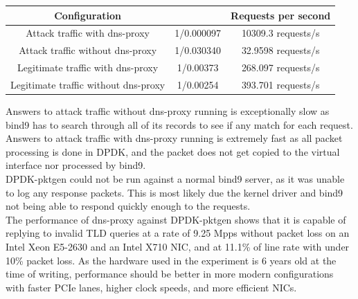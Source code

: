\documentclass[12pt]{extarticle}
\begin{document}
\begin{center}
\begin{tabular}{ ||c|c|c|| }
\hline
Configuration &  & Requests per second \\
\hline
Attack traffic with dns-proxy & 1/0.000097 & 10309.3 requests/s \\
Attack traffic without dns-proxy & 1/0.030340 & 32.9598 requests/s \\
Legitimate traffic with dns-proxy & 1/0.00373 & 268.097 requests/s \\
Legitimate traffic without dns-proxy & 1/0.00254 & 393.701 requests/s \\
\hline
\end{tabular}
\end{center}

Answers to attack traffic without dns-proxy running is exceptionally slow as bind9 has to search through all of its records to see if any match for each request. Answers to attack traffic with dns-proxy running is extremely fast as all packet processing is done in DPDK, and the packet does not get copied to the virtual interface nor processed by bind9. \\

DPDK-pktgen could not be run against a normal bind9 server, as it was unable to log any response packets. This is most likely due the kernel driver and bind9 not being able to respond quickly enough to the requests. \\

The performance of dns-proxy against DPDK-pktgen shows that it is capable of replying to invalid TLD queries at a rate of 9.25 Mpps without packet loss on an Intel Xeon E5-2630 and an Intel X710 NIC, and at 11.1\% of line rate with under 10\% packet loss. As the hardware used in the experiment is 6 years old at the time of writing, performance should be better in more modern configurations with faster PCIe lanes, higher clock speeds, and more efficient NICs. \\
\end{document}
